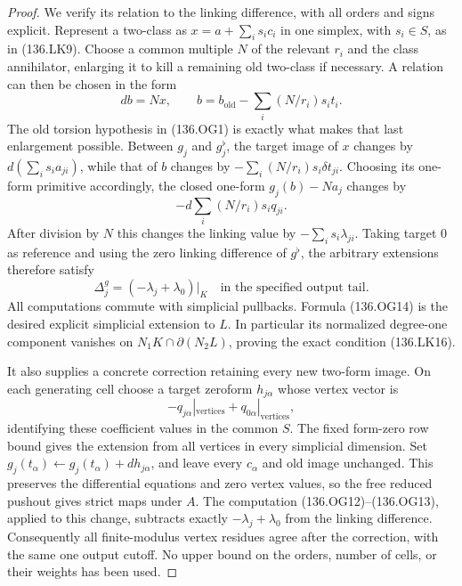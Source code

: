 \begin{proof}
We verify its relation to the linking difference, with all
orders and signs explicit.  Represent a two-class as
\(x=a+\sum_i s_i c_i\) in one simplex, with \(s_i\in S\),
as in (136.LK9).  Choose a common multiple \(N\) of the
relevant \(r_i\) and the class annihilator, enlarging it
to kill a remaining old two-class if necessary.  A relation
can then be chosen in the form
\[
                db=Nx,
                \qquad b=b_{\mathrm{old}}
                              -\sum_i(N/r_i)s_i t_i.
                                                               \tag{136.OG12}
\]
The old torsion hypothesis in (136.OG1) is exactly what makes
that last enlargement possible.  Between \(g_j\) and
\(g_j^\flat\), the target image of \(x\) changes by
\(d(\sum_i s_i a_{ji})\), while that of \(b\) changes
by \(-\sum_i(N/r_i)s_i\delta t_{ji}\).  Choosing its
one-form primitive accordingly, the closed one-form
\(g_j(b)-N a_j\) changes by
\[
                   -d\sum_i(N/r_i)s_i q_{ji}.
                                                               \tag{136.OG13}
\]
After division by \(N\) this changes the linking value by
\(-\sum_i s_i\lambda_{ji}\).  Taking target \(0\)
as reference and using the zero linking difference of
\(g^\flat\), the arbitrary extensions therefore satisfy
\[
             \Delta_j^{g}
                        =(-\lambda_j+\lambda_0)|_K
                 \quad\text{in the specified output tail}.
                                                               \tag{136.OG14}
\]
All computations commute with simplicial pullbacks.  Formula
(136.OG14) is the desired explicit simplicial extension to
\(L\).  In particular its normalized degree-one component
vanishes on \(N_1K\cap\partial(N_2L)\), proving the
exact condition (136.LK16).

It also supplies a concrete correction retaining every new
two-form image.  On each generating cell choose a target
zeroform \(h_{j\alpha}\) whose vertex vector is
\[
        -q_{j\alpha}|_{\mathrm{vertices}}
                              +q_{0\alpha}|_{\mathrm{vertices}},
                                                               \tag{136.OG15}
\]
identifying these coefficient values in the common \(S\).
The fixed form-zero row bound gives the extension from all
vertices in every simplicial dimension.  Set
\(g_j(t_\alpha)\gets g_j(t_\alpha)+d h_{j\alpha}\),
and leave every \(c_\alpha\) and old image unchanged.
This preserves the differential equations and zero vertex
values, so the free reduced pushout gives strict maps under
\(A\).  The computation (136.OG12)--(136.OG13), applied
to this change, subtracts exactly
\(-\lambda_j+\lambda_0\) from the linking difference.
Consequently all finite-modulus vertex residues agree after
the correction, with the same one output cutoff.  No upper bound
on the orders, number of cells, or their weights has been used.


\end{proof}
